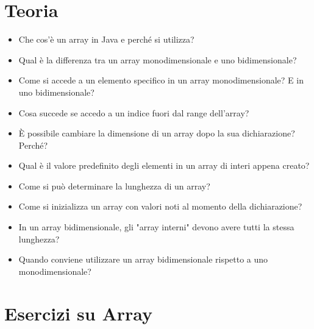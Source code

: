 \documentclass{article}
\begin{document}
\section{Teoria}

\begin{itemize}
    \item Che cos'è un array in Java e perché si utilizza?
    \item Qual è la differenza tra un array monodimensionale e uno bidimensionale?
    \item Come si accede a un elemento specifico in un array monodimensionale? E in uno bidimensionale?
    \item Cosa succede se accedo a un indice fuori dal range dell'array?
    \item È possibile cambiare la dimensione di un array dopo la sua dichiarazione? Perché?
    \item Qual è il valore predefinito degli elementi in un array di interi appena creato?
    \item Come si può determinare la lunghezza di un array?
    \item Come si inizializza un array con valori noti al momento della dichiarazione?
    \item In un array bidimensionale, gli "array interni" devono avere tutti la stessa lunghezza? 
    \item Quando conviene utilizzare un array bidimensionale rispetto a uno monodimensionale?
\end{itemize}

\section{Esercizi su Array}
\end{document}
